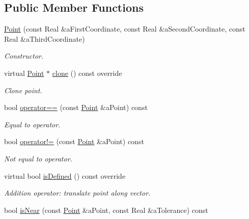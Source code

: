 \subsection*{Public Member Functions}
\begin{DoxyCompactItemize}
\item 
\hyperlink{classostk_1_1math_1_1geom_1_1d3_1_1objects_1_1_point_ad9bee5dadb878200f859b20a34680ae5}{Point} (const Real \&a\+First\+Coordinate, const Real \&a\+Second\+Coordinate, const Real \&a\+Third\+Coordinate)
\begin{DoxyCompactList}\small\item\em Constructor. \end{DoxyCompactList}\item 
virtual \hyperlink{classostk_1_1math_1_1geom_1_1d3_1_1objects_1_1_point}{Point} $\ast$ \hyperlink{classostk_1_1math_1_1geom_1_1d3_1_1objects_1_1_point_aeee85a494568471d821310dc14b5b9d5}{clone} () const override
\begin{DoxyCompactList}\small\item\em Clone point. \end{DoxyCompactList}\item 
bool \hyperlink{classostk_1_1math_1_1geom_1_1d3_1_1objects_1_1_point_a572b7054bc9c2e9b7de13449f5a801e1}{operator==} (const \hyperlink{classostk_1_1math_1_1geom_1_1d3_1_1objects_1_1_point}{Point} \&a\+Point) const
\begin{DoxyCompactList}\small\item\em Equal to operator. \end{DoxyCompactList}\item 
bool \hyperlink{classostk_1_1math_1_1geom_1_1d3_1_1objects_1_1_point_a8203b4594dca180e254463abf0043526}{operator!=} (const \hyperlink{classostk_1_1math_1_1geom_1_1d3_1_1objects_1_1_point}{Point} \&a\+Point) const
\begin{DoxyCompactList}\small\item\em Not equal to operator. \end{DoxyCompactList}\item 
virtual bool \hyperlink{classostk_1_1math_1_1geom_1_1d3_1_1objects_1_1_point_ad7e8b8a4f1bae1c6cd0d5895996d65b7}{is\+Defined} () const override
\begin{DoxyCompactList}\small\item\em Addition operator\+: translate point along vector. \end{DoxyCompactList}\item 
bool \hyperlink{classostk_1_1math_1_1geom_1_1d3_1_1objects_1_1_point_abeeb9784820f7835e352cdbcd62c073a}{is\+Near} (const \hyperlink{classostk_1_1math_1_1geom_1_1d3_1_1objects_1_1_point}{Point} \&a\+Point, const Real \&a\+Tolerance) const

\end{DoxyCompactItemize}
